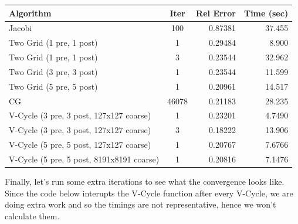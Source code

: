 \documentclass[11pt]{article}
\begin{document}
\begin{center}    
\begin{tabular}{lcrr}
  Algorithm & Iter & Rel Error & Time (sec) \\
  \hline
  Jacobi                                    & 100   &  0.87381  & 37.455 \\
  Two Grid (1 pre, 1 post)                  & 1	    &  0.29484  &  8.900 \\
  Two Grid (1 pre, 1 post)                  & 3	    &  0.23544  & 32.962 \\
  Two Grid (3 pre, 3 post)                  & 1	    &  0.23544  & 11.599 \\
  Two Grid (5 pre, 5 post)                  & 1     &  0.20961  & 14.517 \\
  CG                                        & 46078 &  0.21183  & 28.235 \\
  V-Cycle (3 pre, 3 post, 127x127 coarse)   & 1     &  0.23201  & 4.7490 \\
  V-Cycle (3 pre, 3 post, 127x127 coarse)   & 3     &  0.18222  & 13.906 \\
  V-Cycle (5 pre, 5 post, 127x127 coarse)   & 1     &  0.20767  & 7.6766 \\
  V-Cycle (5 pre, 5 post, 8191x8191 coarse) & 1     &  0.20816  & 7.1476
\end{tabular}
\end{center}

    
    Finally, let's run some extra iterations to see what the convergence
looks like. Since the code below interupts the V-Cycle function after
every V-Cycle, we are doing extra work and so the timings are not
representative, hence we won't calculate them.
\end{document}
